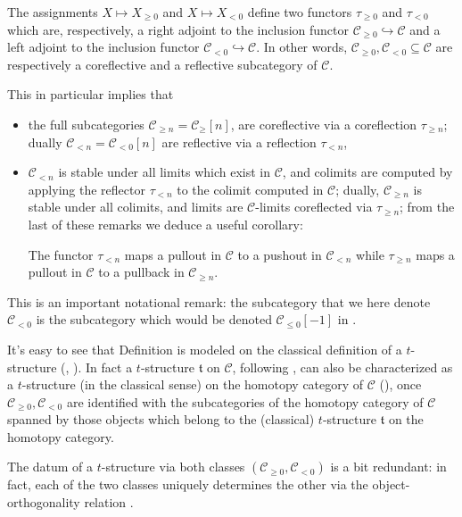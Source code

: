 \documentclass[11pt, a4paper]{amsart}
\newcommand{\tee}{\mathfrak{t}}
\renewcommand{\C}{\mathcal{C}}
\begin{document}
\begin{remark}\label{trunfun}
The assignments $X\mapsto X_{\ge 0}$ and $X\mapsto X_{< 0}$ define two functors $\tau_{\ge 0}$ and $\tau_{<0}$ which are, respectively, a right adjoint to the inclusion functor $\C_{\ge 0}\hookrightarrow \C$ and a left adjoint to the inclusion functor $\C_{<0}\hookrightarrow \C$. In other words, $\C_{\ge 0},\C_{<0} \subseteq \C$ are respectively \cite[\textbf{1.2.1.5-8}]{LurieHA} a coreflective and a reflective subcategory of $\C$.

This in particular implies that 
\begin{itemize}
\item the full subcategories $\C_{\ge n}=\C_\ge[n]$, are coreflective via a coreflection $\tau_{\ge n}$; dually $\C_{<n}=\C_{<0}[n]$ are reflective via a reflection  $\tau_{< n}$, 
\item $\C_{< n}$ is stable under all limits which exist in $\C$, and colimits are computed by applying the reflector $\tau_{< n}$ to the colimit computed in $\C$; dually, $\C_{\ge n}$ is stable under all colimits, and limits are $\C$-limits coreflected via $\tau_{\ge n}$; from the last of these remarks we deduce a useful corollary: 
\begin{corollary}
The functor $\tau_{<n}$ maps a pullout in $\C$ to a pushout in $\C_{<n}$ while $\tau_{\geq n}$ maps a pullout in $\C$ to a pullback in $\C_{\geq n}$.
\end{corollary}
\end{itemize}
\end{remark}
\begin{notat}\marginnote{\textdbend}
This is an important notational remark: the subcategory that we here denote $\C_{<0}$ is the subcategory which would be denoted $\C_{\leq 0}[-1]$ in \cite{LurieHA}.
\end{notat}
\begin{remark}\label{our.1241}
It's easy to see that Definition  is modeled on the classical definition of a $t$-structure (\cite{Kashiwara}, \cite{BBDPervers}). In fact a $t$-structure $\tee$ on $\C$, following \cite{LurieHA}, can also be characterized as a $t$-structure (in the classical sense) on the homotopy category of $\C$ (\cite[Def. \textbf{1.2.1.4}]{LurieHA}), once $\C_{\ge 0}, \C_{<0}$ are identified with the subcategories of the homotopy category of $\C$ spanned by those objects which belong to the (classical) $t$-structure $\tee$ on the homotopy category. \end{remark}
\begin{remark}\label{determines.the.other}
The datum of a $t$-structure via both classes $(\C_{\ge 0}, \C_{<0})$ is a bit redundant: in fact, each of the two classes uniquely determines the other via the object-orthogonality relation .
\end{remark}
\end{document}
